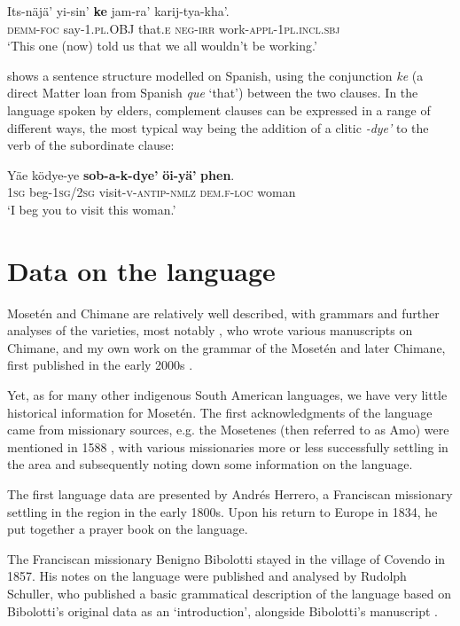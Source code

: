 \documentclass[output=paper,colorlinks,citecolor=brown
]{langscibook}
\begin{document}
\ea \label{sakel_example_4}
\gll Its-näjä’ 	yi-sin’ 		\textbf{ke} 	jam-ra’ 	karij-tya-kha’.\\
     \textsc{dem}\textsc{m}-\textsc{foc}  say-1\textsc{.pl.OBJ}    that.\textsc{e}  \textsc{neg}-\textsc{irr} work-\textsc{appl-1pl.incl.sbj}\\
\glt ‘This one (now) told us that we all wouldn’t be working.’
\z

 shows a sentence structure modelled on Spanish, using the conjunction \textit{ke} (a direct Matter loan from Spanish \textit{que} ‘that’) between the two clauses. In the language spoken by elders, complement clauses can be expressed in a range of different ways, the most typical way being the addition of a clitic \textit{-dye’} to the verb of the subordinate clause:

\ea \label{sakel_example_5}
\gll Yäe  	ködye-ye  	\textbf{sob-a-k-dye’}  		\textbf{öi-yä’}  		\textbf{phen}.\\
     1\textsc{sg}	beg-\textsc{1sg/2sg}	visit-\textsc{v-antip-nmlz}	\textsc{dem}.\textsc{f-loc}	woman\\
\glt ‘I beg you to visit this woman.’
\z

\section{Data on the language}
Mosetén and Chimane are relatively well described, with grammars and further analyses of the varieties, most notably \citet{gill1999pedagogical}, who wrote various manuscripts on Chimane, and my own work on the grammar of the Mosetén and later Chimane, first published in the early 2000s \citep{sakel2004grammar}.

Yet, as for many other indigenous South American languages, we have very little historical information for Mosetén. The first acknowledgments of the language came from missionary sources, e.g. the Mosetenes (then referred to as Amo) were mentioned in 1588 \citep{metraux1942native}, with various missionaries more or less successfully settling in the area and subsequently noting down some information on the language. 

The first language data are presented by Andrés Herrero, a Franciscan missionary settling in the region in the early 1800s. Upon his return to Europe in 1834, he put together a prayer book on the language.

The Franciscan missionary Benigno Bibolotti stayed in the village of Covendo in 1857. His notes on the language were published and analysed by Rudolph Schuller, who published a basic grammatical description of the language based on Bibolotti’s original data as an `introduction', alongside Bibolotti’s manuscript \citep{bibolotti1917moseteno, schuller1917introduction}. 
\end{document}
